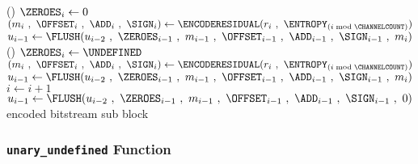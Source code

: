 {{{{{      }(){
        $\text{\ZEROES}_i \leftarrow 0$\;
        $(m_i~,~\text{\OFFSET}_i~,~\text{\ADD}_i~,~\text{\SIGN}_i) \leftarrow \ENCODERESIDUAL(r_i~,~\text{\ENTROPY}_{(i \bmod \text{\CHANNELCOUNT})})$\;
        $u_{i - 1} \leftarrow \FLUSH(u_{i - 2}~,~\text{\ZEROES}_{i - 1}~,~m_{i - 1}~,~\text{\OFFSET}_{i - 1}~,~\text{\ADD}_{i - 1}~,~\text{\SIGN}_{i - 1}~,~m_i)$\;
      }
    }
  }(){
    $\text{\ZEROES}_i \leftarrow \text{\UNDEFINED}$\;
    $(m_i~,~\text{\OFFSET}_i~,~\text{\ADD}_i~,~\text{\SIGN}_i) \leftarrow \ENCODERESIDUAL(r_i~,~\text{\ENTROPY}_{(i \bmod \text{\CHANNELCOUNT})})$\;
    $u_{i - 1} \leftarrow \FLUSH(u_{i - 2}~,~\text{\ZEROES}_{i - 1}~,~m_{i - 1}~,~\text{\OFFSET}_{i - 1}~,~\text{\ADD}_{i - 1}~,~\text{\SIGN}_{i - 1}~,~m_i)$\;
  }
  $i \leftarrow i + 1$\;
}
\BlankLine
{}
$u_{i - 1} \leftarrow \FLUSH(u_{i - 2}~,~\text{\ZEROES}_{i - 1}~,~m_{i - 1}~,~\text{\OFFSET}_{i - 1}~,~\text{\ADD}_{i - 1}~,~\text{\SIGN}_{i - 1}~,~0)$\;
\BlankLine
\Return encoded bitstream sub block\;
\EALGORITHM

\subsubsection{\texttt{unary\_undefined} Function}
\EALGORITHM
}

\clearpage

